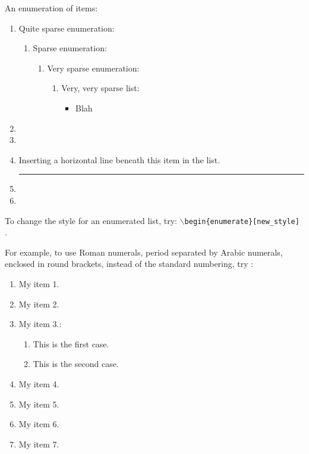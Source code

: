 An enumeration of items: \vspace{-0.3cm}
\begin{enumerate} \itemsep -4pt
\item Quite sparse enumeration: \vspace{-0.3cm}
	\begin{enumerate} \itemsep -2pt
	\item Sparse enumeration: \vspace{-0.2cm}
		\begin{enumerate} \itemsep -2pt
		\item Very sparse enumeration: \vspace{-0.1cm}
			\begin{enumerate} \itemsep -1pt
			\item Very, very sparse list: \vspace{-0.1cm}
				\begin{itemize} \itemsep -1pt
				\item Blah
				\end{itemize}
			\end{enumerate}
		\end{enumerate}
	\end{enumerate}
\item 
\item 
\item Inserting a horizontal line beneath this item in the list.
\\ \rule{6in}{.1pt}
\item 
\item 
\end{enumerate}



To change the style for an enumerated list, try: {\tt $\backslash$begin\{enumerate\}[new\_style]} \cite{Kopka2004}.



For example, to use Roman numerals, period separated by Arabic numerals, enclosed in round brackets, instead of the standard numbering, try \cite{Klement2016}: \vspace{-0.3cm}
\begin{enumerate}[label=(\Alph*.\arabic*)] \itemsep -4pt
\item My item 1.
\item My item 2.
\item My item 3.: \vspace{-0.3cm}
	\begin{enumerate} \itemsep -2pt
	\item This is the first case.
	\item This is the second case.
	\end{enumerate}
\item My item 4.
\item My item 5.
\item My item 6.
\item My item 7.
\end{enumerate}




